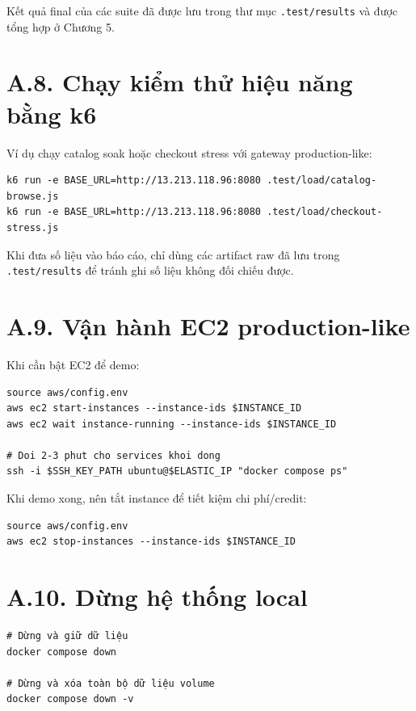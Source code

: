 \documentclass[../DoAn.tex]{subfiles}
\begin{document}
Kết quả final của các suite đã được lưu trong thư mục \texttt{.test/results} và được tổng hợp
ở Chương 5.

\section*{A.8. Chạy kiểm thử hiệu năng bằng k6}

Ví dụ chạy catalog soak hoặc checkout stress với gateway production-like:

\begin{lstlisting}[numbers=none,xleftmargin=0pt,breaklines=true]
k6 run -e BASE_URL=http://13.213.118.96:8080 .test/load/catalog-browse.js
k6 run -e BASE_URL=http://13.213.118.96:8080 .test/load/checkout-stress.js
\end{lstlisting}

Khi đưa số liệu vào báo cáo, chỉ dùng các artifact raw đã lưu trong \texttt{.test/results}
để tránh ghi số liệu không đối chiếu được.

\section*{A.9. Vận hành EC2 production-like}

Khi cần bật EC2 để demo:

\begin{lstlisting}[numbers=none,xleftmargin=0pt,breaklines=true]
source aws/config.env
aws ec2 start-instances --instance-ids $INSTANCE_ID
aws ec2 wait instance-running --instance-ids $INSTANCE_ID

# Doi 2-3 phut cho services khoi dong
ssh -i $SSH_KEY_PATH ubuntu@$ELASTIC_IP "docker compose ps"
\end{lstlisting}

Khi demo xong, nên tắt instance để tiết kiệm chi phí/credit:

\begin{lstlisting}[numbers=none,xleftmargin=0pt,breaklines=true]
source aws/config.env
aws ec2 stop-instances --instance-ids $INSTANCE_ID
\end{lstlisting}

\section*{A.10. Dừng hệ thống local}

\begin{verbatim}
# Dừng và giữ dữ liệu
docker compose down

# Dừng và xóa toàn bộ dữ liệu volume
docker compose down -v
\end{verbatim}
\end{document}
